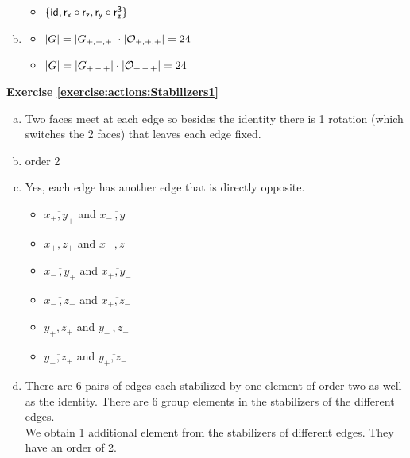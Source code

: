 \begin{enumerate}[(a)]
\begin{itemize}
	\item
	$\{\sf{id}, r_x\circ r_z, r_y\circ r_z^{3}\}$
	\end{itemize}
	
\item
	\begin{itemize}
	\item
	$|G| = |G_{+,+,+}| \cdot |{\cal O}_{+,+,+}| = 24$
	
	\item
	$|G| = |G_{+\,-\,+}| \cdot |{\cal O}_{+\,-\,+}| = 24$
	\end{itemize}
\end{enumerate}

\noindent\textbf{Exercise \ref{exercise:actions:Stabilizers1}}
\begin{enumerate}[(a)]
\item
Two faces meet at each edge so besides the identity there is 1 rotation (which switches the 2 faces)  that leaves each edge fixed.  
 
\item
order 2 

\item
Yes, each edge has another edge that is directly opposite.
	\begin{multicols}{2}
	\begin{itemize}
	\item
	 $\overline{x_+,y_+}$ and $\overline{x_-\,,y_-\,}$
	 
	\item
	 $\overline{x_+,z_+}$ and $\overline{x_-\,,z_-\,}$
	 
	 \item
	 $\overline{x_-\,,y_+}$ and $\overline{x_+,y_-\,}$
	 
	\item
	 $\overline{x_-\,,z_+}$ and $\overline{x_+,z_-\,}$
	 
	 \item
	 $\overline{y_+,z_+}$ and $\overline{y_-\,,z_-\,}$
	 
	 \item
	 $\overline{y_-,z_+}$ and $\overline{y_+,z_-\,}$
	\end{itemize}
	\end{multicols}
	
\item
There are 6 pairs of edges each stabilized by one element of order two as well as the identity.  There are 6 group elements in the stabilizers of the different edges.
\\
We obtain 1 additional element from the stabilizers of different edges.  They have an order of 2.
\end{enumerate}

